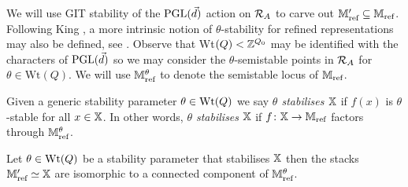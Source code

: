 \documentclass[12pt]{amsart}
\newcommand{\Wt}{\textup{Wt}}
\begin{document}
We will use GIT stability of the $\operatorname{PGL}(\vec{d})$ action on $\mathcal{R}_A$ to carve out $\mathbb{M}'_{\text{ref}} \subseteq \mathbb{M}_{\text{ref}}$.
Following King \cite{Ki}, a more intrinsic notion of $\theta$-stability for refined representations may also be defined,  see \cite[Definition 3.4]{Abd}. 
Observe that  Wt$(Q) < \mathbb{Z}^{Q_0}$ may be identified with the characters of $\operatorname{PGL}(\vec{d})$ so we may consider the $\theta$-semistable points in $\mathcal{R}_A$ for $\theta \in \text{Wt}(Q)$.
We will use $\mathbb{M}_{\textup{ref}}^\theta$ to denote the semistable locus of $\mathbb{M}_{\textup{ref}}$.


\begin{definition}
Given a generic stability parameter $\theta \in \Wt(Q)$ we say {\em $\theta$ stabilises $\mathbb{X}$} if $f(x)$ is $\theta$-stable for all $x \in \mathbb{X}$.
In other words, {\em $\theta$ stabilises $\mathbb{X}$} if $f \colon \mathbb{X} \rightarrow \mathbb{M}_{\textup{ref}}$ factors through $\mathbb{M}_{\textup{ref}}^\theta$.
\end{definition}

\begin{theorem}\label{thm:stab}
Let $\theta \in \Wt(Q)$ be a stability parameter that stabilises $\mathbb{X}$ then the stacks $\mathbb{M}_{\textup{ref}}' \simeq \mathbb{X}$ are isomorphic to a connected component of $\mathbb{M}_{\textup{ref}}^\theta$.
\end{theorem}
\end{document}
